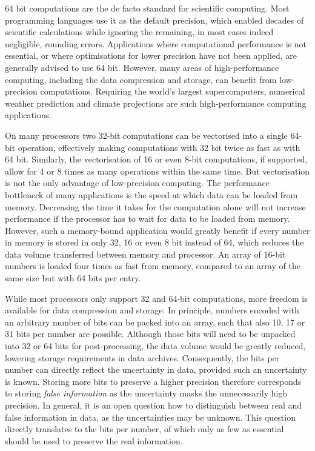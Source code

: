 64 bit computations are the de facto standard for scientific computing. Most programming languages use
it as the default precision, which enabled decades of scientific calculations while ignoring the remaining,
in most cases indeed negligible, rounding errors. Applications where computational performance is not essential,
or where optimisations for lower precision have not been applied, are generally advised to use 64 bit.
However, many areas of high-performance computing, including the data compression and storage,
can benefit from low-precision computations. Requiring the world's largest supercomputers, numerical
weather prediction and climate projections are such high-performance computing applications.

On many processors two 32-bit computations can be vectorised into a single 64-bit operation, effectively
making computations with 32 bit twice as fast as with 64 bit. Similarly, the vectorisation of 16 or even 8-bit
computations, if supported, allow for 4 or 8 times as many operations within the same time. But vectorisation
is not the only advantage of low-precision computing. The performance bottleneck of many applications is the
speed at which data can be loaded from memory. Decreasing the time it takes for the computation alone
will not increase performance if the processor has to wait for data to be loaded from memory. However,
such a memory-bound application would greatly benefit if every number in memory is stored in only 32, 16 or even 8
bit instead of 64, which reduces the data volume transferred between memory and processor. An array of 16-bit numbers
is loaded four times as fast from memory, compared to an array of the same size but with 64 bits per entry.

While most processors only support 32 and 64-bit computations, more freedom is available for data compression and storage:
In principle, numbers encoded with an arbitrary number of bits can be packed into an array, such that also
10, 17 or 31 bits per number are possible. Although those bits will need to be unpacked into 32 or 64 bits for 
post-processing, the data volume would be greatly reduced, lowering storage requirements in data archives.
Consequently, the bits per number can directly reflect the uncertainty in data, provided such an uncertainty is known.
Storing more bits to preserve a higher precision therefore corresponds to storing \emph{false information} as the
uncertainty masks the unnecessarily high precision. In general, it is an open question how to distinguish between
real and false information in data, as the uncertainties may be unknown. This question directly translates to
the bits per number, of which only as few as essential should be used to preserve the real information.

